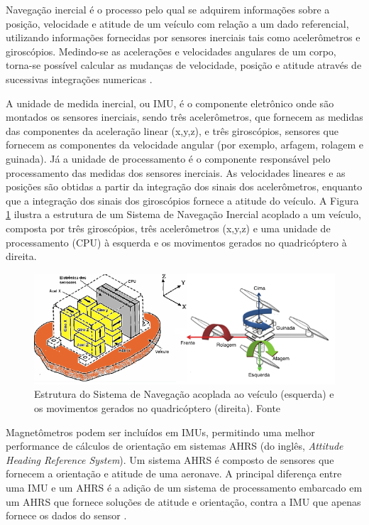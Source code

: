 \documentclass[a4paper, 12pt]{article}
\begin{document}
Navegação inercial é o processo pelo qual se adquirem informações sobre a posição, velocidade e atitude de um veículo com relação a um dado referencial, utilizando informações fornecidas por sensores inerciais tais como acelerômetros e giroscópios. Medindo-se as acelerações e velocidades angulares de um corpo, torna-se possível calcular as mudanças de velocidade, posição e atitude através de sucessivas integrações numericas \cite{Adalberto2009}.

A unidade de medida inercial, ou IMU, é o componente eletrônico onde são montados os sensores inerciais, sendo três acelerômetros, que fornecem as medidas das componentes da aceleração linear (x,y,z), e três giroscópios, sensores que fornecem as componentes da velocidade angular (por exemplo, arfagem, rolagem e guinada). Já a unidade de processamento é o componente responsável pelo processamento das medidas dos sensores inerciais. As velocidades lineares e as posições são obtidas a partir da integração dos sinais dos acelerômetros, enquanto que a integração dos sinais dos giroscópios fornece a atitude do veículo.  A Figura \ref{fig:imuStrap} ilustra a estrutura de um Sistema de Navegação Inercial acoplado a um veículo, composta por três giroscópios, três acelerômetros (x,y,z) e uma unidade de processamento (CPU) à esquerda e os movimentos gerados no quadricóptero à direita.

\begin{figure}[h]
	\centering
		\includegraphics[scale=0.6]{img/imuStrap.png}
	\caption{Estrutura do Sistema de Navegação acoplada ao veículo (esquerda) e os movimentos gerados no quadricóptero (direita). Fonte \cite{Adalberto2009}}
	\label{fig:imuStrap}
\end{figure}

Magnetômetros podem ser incluídos em IMUs, permitindo uma melhor performance de cálculos de orientação em sistemas AHRS (do inglês, \textit{Attitude Heading Reference System}). Um sistema AHRS é composto de sensores que fornecem a orientação e atitude de uma aeronave. A principal diferença entre uma IMU e um AHRS é a adição de um sistema de processamento embarcado em um AHRS que fornece soluções de atitude e orientação, contra a IMU que apenas fornece os dados do sensor \cite{Angonese2013}.
\end{document}

